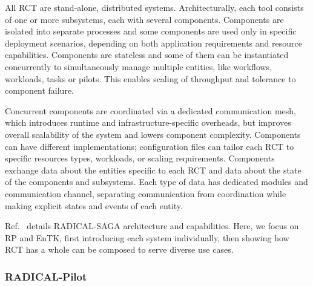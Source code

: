 \documentclass[preprint,12pt, a4paper]{elsarticle}
\begin{document}

All RCT are stand-alone, distributed systems. Architecturally, each tool
consists of one or more subsystems, each with several components. Components
are isolated into separate processes and some components are used only in
specific deployment scenarios, depending on both application requirements and
resource capabilities. Components are stateless and some of them can be
instantiated concurrently to simultaneously manage multiple entities, like
workflows, workloads, tasks or pilots. This enables scaling of throughput and
tolerance to component failure.

Concurrent components are coordinated via a dedicated communication mesh,
which introduces runtime and infrastructure-specific overheads, but improves
overall scalability of the system and lowers component complexity. Components
can have different implementations; configuration files can tailor each RCT
to specific resources types, workloads, or scaling requirements. Components
exchange data about the entities specific to each RCT and data about the
state of the components and subsystems. Each type of data has dedicated
modules and communication channel, separating communication from coordination
while making explicit states and events of each entity.

Ref.~\cite{merzky2015saga} details RADICAL-SAGA architecture and
capabilities. Here, we focus on RP and EnTK, first introducing each system
individually, then showing how RCT has a whole can be composed to serve
diverse use cases.

\subsubsection{RADICAL-Pilot}\label{sssec:arch_rp}
\end{document}
